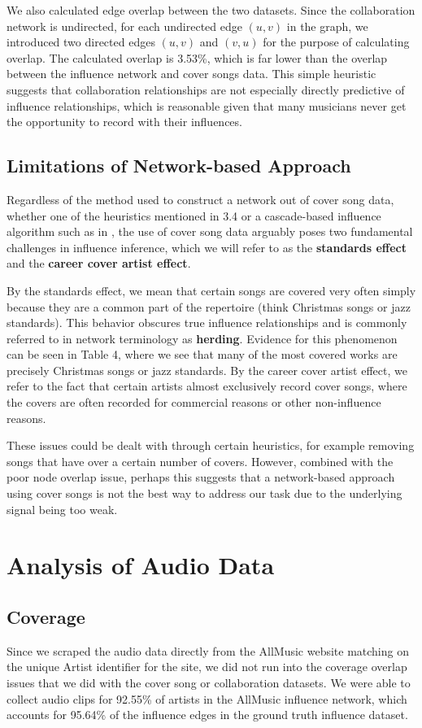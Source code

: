We also calculated edge overlap between the two datasets. Since the collaboration network is undirected, for each undirected edge $(u,v)$ in the graph, we introduced two directed edges $(u,v)$ and $(v,u)$ for the purpose of calculating overlap. The calculated overlap is 3.53\%, which is far lower than the overlap between the influence network and cover songs data. This simple heuristic suggests that collaboration relationships are not especially directly predictive of influence relationships, which is reasonable given that many musicians never get the opportunity to record with their influences.

\subsection{Limitations of Network-based Approach}
Regardless of the method used to construct a network out of cover song data, whether one of the heuristics mentioned in 3.4 or a cascade-based influence algorithm such as in \cite{gomez2010inferring}, the use of cover song data arguably poses two fundamental challenges in influence inference, which we will refer to as the \textbf{standards effect} and the \textbf{career cover artist effect}.

By the standards effect, we mean that certain songs are covered very often simply because they are a common part of the repertoire (think Christmas songs or jazz standards). This behavior obscures true influence relationships and is commonly referred to in network terminology as \textbf{herding}. Evidence for this phenomenon can be seen in Table 4, where we see that many of the most covered works are precisely Christmas songs or jazz standards. By the career cover artist effect, we refer to the fact that certain artists almost exclusively record cover songs, where the covers are often recorded for commercial reasons or other non-influence reasons.

These issues could be dealt with through certain heuristics, for example removing songs that have over a certain number of covers. However, combined with the poor node overlap issue, perhaps this suggests that a network-based approach using cover songs is not the best way to address our task due to the underlying signal being too weak.

\section{Analysis of Audio Data}
\subsection{Coverage}
Since we scraped the audio data directly from the AllMusic website matching on the unique Artist identifier for the site, we did not run into the coverage overlap issues that we did with the cover song or collaboration datasets. We were able to collect audio clips for 92.55\% of artists in the AllMusic influence network, which accounts for 95.64\% of the influence edges in the ground truth influence dataset. 

